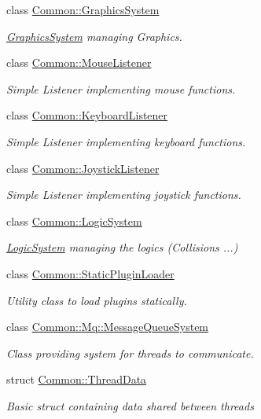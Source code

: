 \begin{DoxyCompactItemize}
class \hyperlink{class_common_1_1_graphics_system}{Common\+::\+Graphics\+System}
\begin{DoxyCompactList}\small\item\em \hyperlink{class_common_1_1_graphics_system}{Graphics\+System} managing Graphics. \end{DoxyCompactList}\item 
class \hyperlink{class_common_1_1_mouse_listener}{Common\+::\+Mouse\+Listener}
\begin{DoxyCompactList}\small\item\em Simple Listener implementing mouse functions. \end{DoxyCompactList}\item 
class \hyperlink{class_common_1_1_keyboard_listener}{Common\+::\+Keyboard\+Listener}
\begin{DoxyCompactList}\small\item\em Simple Listener implementing keyboard functions. \end{DoxyCompactList}\item 
class \hyperlink{class_common_1_1_joystick_listener}{Common\+::\+Joystick\+Listener}
\begin{DoxyCompactList}\small\item\em Simple Listener implementing joystick functions. \end{DoxyCompactList}\item 
class \hyperlink{class_common_1_1_logic_system}{Common\+::\+Logic\+System}
\begin{DoxyCompactList}\small\item\em \hyperlink{class_common_1_1_logic_system}{Logic\+System} managing the logics (Collisions ...) \end{DoxyCompactList}\item 
class \hyperlink{class_common_1_1_static_plugin_loader}{Common\+::\+Static\+Plugin\+Loader}
\begin{DoxyCompactList}\small\item\em Utility class to load plugins statically. \end{DoxyCompactList}\item 
class \hyperlink{class_common_1_1_mq_1_1_message_queue_system}{Common\+::\+Mq\+::\+Message\+Queue\+System}
\begin{DoxyCompactList}\small\item\em Class providing system for threads to communicate. \end{DoxyCompactList}\item 
struct \hyperlink{struct_common_1_1_thread_data}{Common\+::\+Thread\+Data}
\begin{DoxyCompactList}\small\item\em Basic struct containing data shared between threads


\end{DoxyCompactList}
\end{DoxyCompactItemize}
